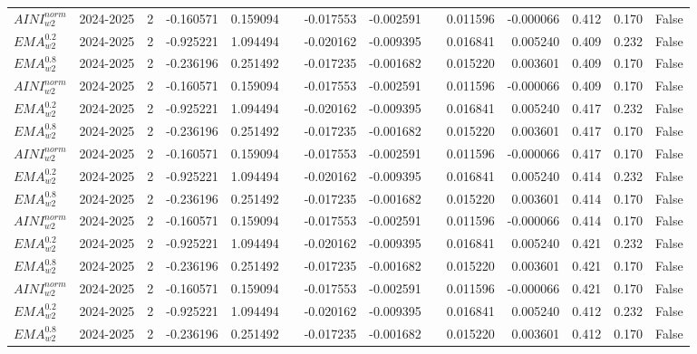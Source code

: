\begin{tabular}{@{}llrrrrrrrrrlll@{}}
$AINI^{norm}_{w2}$ & 2024-2025 & 2 & -0.160571 & 0.159094 &  & -0.017553 & -0.002591 &  & 0.011596 & -0.000066 & 0.412 & 0.170 & False \\
$EMA^{0.2}_{w2}$ & 2024-2025 & 2 & -0.925221 & 1.094494 &  & -0.020162 & -0.009395 &  & 0.016841 & 0.005240 & 0.409 & 0.232 & False \\
$EMA^{0.8}_{w2}$ & 2024-2025 & 2 & -0.236196 & 0.251492 &  & -0.017235 & -0.001682 &  & 0.015220 & 0.003601 & 0.409 & 0.170 & False \\
$AINI^{norm}_{w2}$ & 2024-2025 & 2 & -0.160571 & 0.159094 &  & -0.017553 & -0.002591 &  & 0.011596 & -0.000066 & 0.409 & 0.170 & False \\
$EMA^{0.2}_{w2}$ & 2024-2025 & 2 & -0.925221 & 1.094494 &  & -0.020162 & -0.009395 &  & 0.016841 & 0.005240 & 0.417 & 0.232 & False \\
$EMA^{0.8}_{w2}$ & 2024-2025 & 2 & -0.236196 & 0.251492 &  & -0.017235 & -0.001682 &  & 0.015220 & 0.003601 & 0.417 & 0.170 & False \\
$AINI^{norm}_{w2}$ & 2024-2025 & 2 & -0.160571 & 0.159094 &  & -0.017553 & -0.002591 &  & 0.011596 & -0.000066 & 0.417 & 0.170 & False \\
$EMA^{0.2}_{w2}$ & 2024-2025 & 2 & -0.925221 & 1.094494 &  & -0.020162 & -0.009395 &  & 0.016841 & 0.005240 & 0.414 & 0.232 & False \\
$EMA^{0.8}_{w2}$ & 2024-2025 & 2 & -0.236196 & 0.251492 &  & -0.017235 & -0.001682 &  & 0.015220 & 0.003601 & 0.414 & 0.170 & False \\
$AINI^{norm}_{w2}$ & 2024-2025 & 2 & -0.160571 & 0.159094 &  & -0.017553 & -0.002591 &  & 0.011596 & -0.000066 & 0.414 & 0.170 & False \\
$EMA^{0.2}_{w2}$ & 2024-2025 & 2 & -0.925221 & 1.094494 &  & -0.020162 & -0.009395 &  & 0.016841 & 0.005240 & 0.421 & 0.232 & False \\
$EMA^{0.8}_{w2}$ & 2024-2025 & 2 & -0.236196 & 0.251492 &  & -0.017235 & -0.001682 &  & 0.015220 & 0.003601 & 0.421 & 0.170 & False \\
$AINI^{norm}_{w2}$ & 2024-2025 & 2 & -0.160571 & 0.159094 &  & -0.017553 & -0.002591 &  & 0.011596 & -0.000066 & 0.421 & 0.170 & False \\
$EMA^{0.2}_{w2}$ & 2024-2025 & 2 & -0.925221 & 1.094494 &  & -0.020162 & -0.009395 &  & 0.016841 & 0.005240 & 0.412 & 0.232 & False \\
$EMA^{0.8}_{w2}$ & 2024-2025 & 2 & -0.236196 & 0.251492 &  & -0.017235 & -0.001682 &  & 0.015220 & 0.003601 & 0.412 & 0.170 & False \\

\end{tabular}
